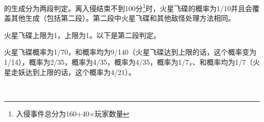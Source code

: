 \subsubsection{}
的生成分为两段判定。离入侵结束不到100分\footnote{入侵事件总分为160+40$\times$玩家数量}时，火星飞碟的概率为1/10并且会覆盖其他生成（包括第二段）。第二段中火星飞碟和其他敌怪处理方法相同。

火星飞碟上限为1，上限为1。以下是第二段判定。

火星飞碟概率为1/70，和概率均为9/140（火星飞碟达到上限的话，这个概率变为1/14），概率为2/35，概率为4/35，概率为4/35，概率为1/7，、和概率均为1/7（火星走妖达到上限的话，这个概率为4/21）。
\begin{figure}[h]
    \centering
    \\

\end{figure}
